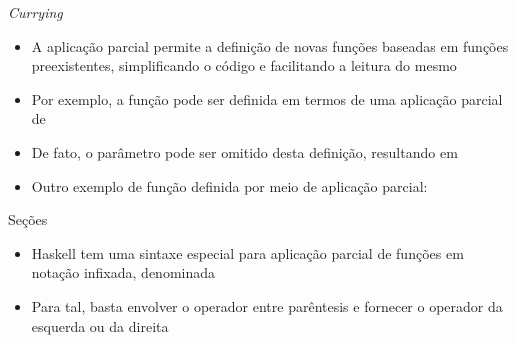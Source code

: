 \begin{frame}[fragile]{\it Currying}

    \begin{itemize}
        \item A aplicação parcial permite a definição de novas funções baseadas em funções
            preexistentes, simplificando o código e facilitando a leitura do mesmo

        \item Por exemplo, a função  pode ser definida em termos de uma
            aplicação parcial de 


        \item De fato, o parâmetro  pode ser omitido desta definição,
            resultando em


        \item Outro exemplo de função definida por meio de aplicação parcial:

    \end{itemize}

\end{frame}

\begin{frame}[fragile]{Seções}

    \begin{itemize}
        \item Haskell tem uma sintaxe especial para aplicação parcial de funções em notação
            infixada, denominada 

        \item Para tal, basta envolver o operador entre parêntesis e fornecer o operador da
            esquerda ou da direita 

    \end{itemize}

\end{frame}

